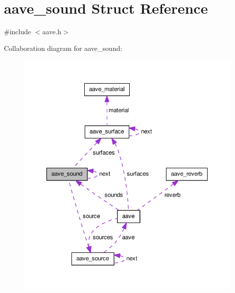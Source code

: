 \hypertarget{structaave__sound}{\section{aave\-\_\-sound Struct Reference}
\label{structaave__sound}
}


{\ttfamily \#include $<$aave.\-h$>$}



Collaboration diagram for aave\-\_\-sound\-:\nopagebreak
\begin{figure}[H]
\begin{center}
\leavevmode
\includegraphics[width=350pt]{structaave__sound__coll__graph}
\end{center}
\end{figure}
